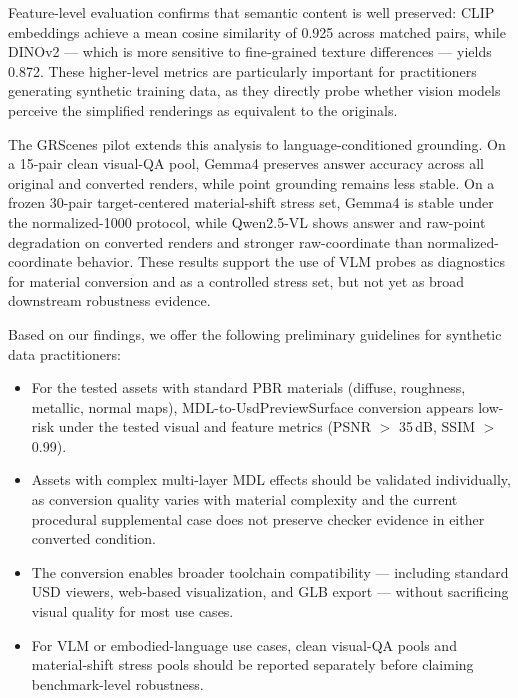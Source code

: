 Feature-level evaluation confirms that semantic content is well preserved:
CLIP embeddings achieve a mean cosine similarity of 0.925 across matched pairs,
while DINOv2 --- which is more sensitive to fine-grained texture differences ---
yields 0.872. These higher-level metrics are particularly important for
practitioners generating synthetic training data, as they directly probe
whether vision models perceive the simplified renderings as equivalent to the
originals.

The GRScenes pilot extends this analysis to language-conditioned grounding. On
a 15-pair clean visual-QA pool, Gemma4 preserves answer accuracy across all
original and converted renders, while point grounding remains less stable. On a
frozen 30-pair target-centered material-shift stress set, Gemma4 is stable under
the normalized-1000 protocol, while Qwen2.5-VL shows answer and raw-point
degradation on converted renders and stronger raw-coordinate than
normalized-coordinate behavior. These results support the use of VLM probes as
diagnostics for material conversion and as a controlled stress set, but not yet
as broad downstream robustness evidence.

Based on our findings, we offer the following preliminary guidelines for
synthetic data practitioners:
\begin{itemize}
    \item For the tested assets with standard PBR materials (diffuse,
    roughness, metallic, normal maps), MDL-to-UsdPreviewSurface conversion
    appears low-risk under the tested visual and feature metrics
    (PSNR $>$ 35\,dB, SSIM $>$ 0.99).
    \item Assets with complex multi-layer MDL effects should be validated
    individually, as conversion quality varies with material complexity and the
    current procedural supplemental case does not preserve checker evidence in
    either converted condition.
    \item The conversion enables broader toolchain compatibility --- including
    standard USD viewers, web-based visualization, and GLB export --- without
    sacrificing visual quality for most use cases.
    \item For VLM or embodied-language use cases, clean visual-QA pools and
    material-shift stress pools should be reported separately before claiming
    benchmark-level robustness.
\end{itemize}

